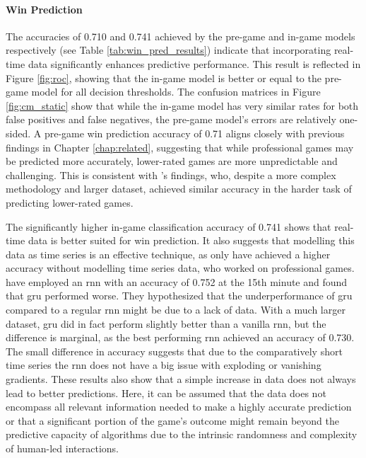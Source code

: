 \documentclass[12pt, a4paper, headinclude, twoside, plainheadsepline, open=right, numbers=noenddot, hidelinks, toc=listof, toc=bibliography]{scrreprt}
\begin{document}
\paragraph{Win Prediction}
The accuracies of 0.710 and 0.741 achieved by the pre-game and in-game models respectively (see Table \ref{tab:win_pred_results}) indicate that incorporating real-time data significantly enhances predictive performance. 
This result is reflected in Figure \ref{fig:roc}, showing that the in-game model is better or equal to the pre-game model for all decision thresholds.
The confusion matrices in Figure \ref{fig:cm_static} show that while the in-game model has very similar rates for both false positives and false negatives, the pre-game model's errors are relatively one-sided.
A pre-game win prediction accuracy of 0.71 aligns closely with previous findings in Chapter \ref{chap:related}, suggesting that while professional games may be predicted more accurately, lower-rated games are more unpredictable and challenging.
This is consistent with 's  \cite{whiteScalablePsychologicalMomentum2020} findings, who, despite a more complex methodology and larger dataset, achieved similar accuracy in the harder task of predicting lower-rated games.

The significantly higher in-game classification accuracy of 0.741 shows that real-time data is better suited for win prediction.
It also suggests that modelling this data as time series is an effective technique, as only \citeauthor{baileyStatisticalLearningEsports} \cite{baileyStatisticalLearningEsports} have achieved a higher accuracy without modelling time series data, who worked on professional games.
 \cite{silvaContinuousOutcomePrediction2018} have employed an \ac{rnn} with an accuracy of 0.752 at the 15th minute and found that \ac{gru} performed worse. 
They hypothesized that the underperformance of \ac{gru} compared to a regular \ac{rnn} might be due to a lack of data.
With a much larger dataset, \ac{gru} did in fact perform slightly better than a vanilla \ac{rnn}, but the difference is marginal, as the best performing \ac{rnn} achieved an accuracy of 0.730.
The small difference in accuracy suggests that due to the comparatively short time series the \ac{rnn} does not have a big issue with exploding or vanishing gradients.
These results also show that a simple increase in data does not always lead to better predictions.
Here, it can be assumed that the data does not encompass all relevant information needed to make a highly accurate prediction or that a significant portion of the game's outcome might remain beyond the predictive capacity of algorithms due to the intrinsic randomness and complexity of human-led interactions.
\end{document}
